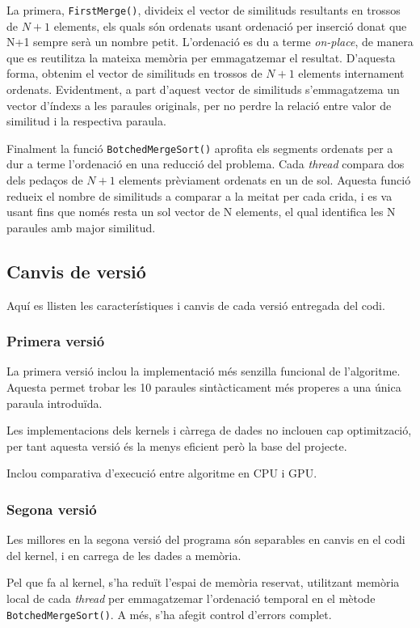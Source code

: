 \documentclass[catalan,10pt,a4paper]{article}
\begin{document}
La primera, \verb|FirstMerge()|, divideix el vector de similituds resultants en trossos de $N+1$ elements, els quals són ordenats usant ordenació per inserció donat que N+1 sempre serà un nombre petit. L'ordenació es du a terme \textit{on-place}, de manera que es reutilitza la mateixa memòria per emmagatzemar el resultat.\newline
D'aquesta forma, obtenim el vector de similituds en trossos de $N+1$ elements internament ordenats. Evidentment, a part d'aquest vector de similituds s'emmagatzema un vector d'índexs a les paraules originals, per no perdre la relació entre valor de similitud i la respectiva paraula.

Finalment la funció \verb|BotchedMergeSort()| aprofita els segments ordenats per a dur a terme l'ordenació en una reducció del problema. Cada \textit{thread} compara dos dels pedaços de $N+1$ elements prèviament ordenats en un de sol.\newline
Aquesta funció redueix el nombre de similituds a comparar a la meitat per cada crida, i es va usant fins que només resta un sol vector de N elements, el qual identifica les N paraules amb major similitud.

\subsection*{Canvis de versió}
Aquí es llisten les característiques i canvis de cada versió entregada del codi.
\subsubsection*{Primera versió}
La primera versió inclou la implementació més senzilla funcional de l'algoritme. Aquesta permet trobar les 10 paraules sintàcticament més properes a una única paraula introduïda.

Les implementacions dels kernels i càrrega de dades no inclouen cap optimització, per tant aquesta versió és la menys eficient però la base del projecte.

Inclou comparativa d'execució entre algoritme en CPU i GPU.
\subsubsection*{Segona versió}

Les millores en la segona versió del programa són separables en canvis en el codi del kernel, i en carrega de les dades a memòria.

Pel que fa al kernel, s'ha reduït l'espai de memòria reservat, utilitzant memòria local de cada \textit{thread} per emmagatzemar l'ordenació temporal en el mètode \verb|BotchedMergeSort()|. A més, s'ha afegit control d'errors complet.
\end{document}
